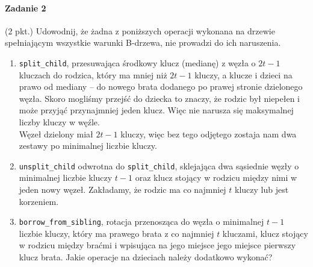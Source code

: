 \documentclass[18pt]{extarticle}
\begin{document}
\paragraph{Zadanie 2} (2 pkt.) Udowodnij, że żadna z poniższych operacji wykonana na drzewie spełniającym wszystkie warunki B-drzewa, nie prowadzi do ich naruszenia.
\begin{enumerate}[label=(\alph*)]
    \item \verb|split_child|, przesuwająca środkowy klucz (medianę) z węzła o $2t-1$ kluczach do rodzica, który ma mniej niż $2t-1$ kluczy, a klucze i dzieci na prawo od mediany -- do nowego brata dodanego po prawej stronie dzielonego węzła.
        Skoro mogliśmy przejść do dziecka to znaczy, że rodzic był niepełen i może przyjąć przynajmniej jeden klucz. Więc nie narusza się maksymalnej liczby kluczy w węźle. \\
        Węzeł dzielony miał $2t-1$ kluczy, więc bez tego odjętego zostaja nam dwa zestawy po minimalnej liczbie kluczy.
    \item \verb|unsplit_child| odwrotna do \verb|split_child|, sklejająca dwa sąsiednie węzły o minimalnej liczbie
          kluczy $t-1$ oraz klucz stojący w rodzicu między nimi w jeden nowy węzeł. Zakładamy, że rodzic ma co
          najmniej $t$ kluczy lub jest korzeniem.
    \item \verb|borrow_from_sibling|, rotacja przenosząca do węzła o minimalnej $t-1$ liczbie kluczy, który ma
          prawego brata z co najmniej $t$ kluczami, klucz stojący w rodzicu między braćmi i wpisująca na jego miejsce jego miejsce pierwszy klucz brata. Jakie operacje na dzieciach należy dodatkowo wykonać?
\end{enumerate}
\end{document}
